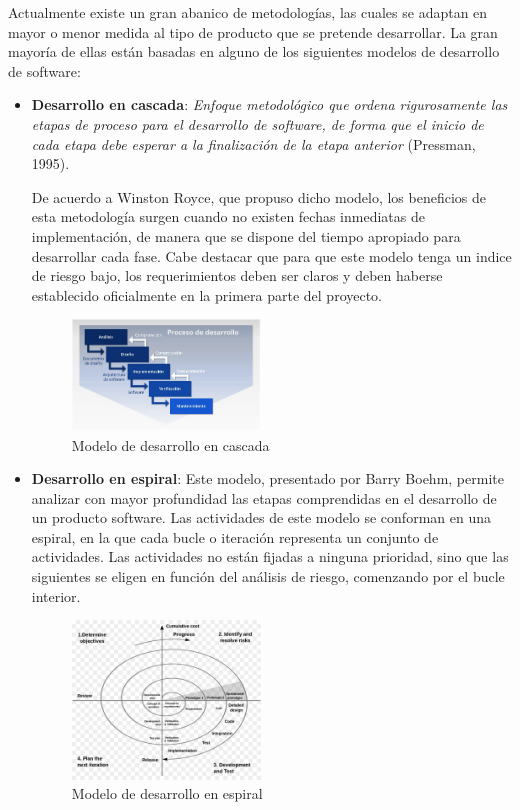 Actualmente existe un gran abanico de metodologías, las cuales se adaptan en mayor o menor medida al tipo de producto 
que se pretende desarrollar. La gran mayoría de ellas están basadas en alguno de los siguientes modelos de desarrollo 
de software:
\begin{itemize}
    \item \textbf{Desarrollo en cascada}: \textit{Enfoque metodológico que ordena rigurosamente las etapas de proceso para el 
    desarrollo de software, de forma que el inicio de cada etapa debe esperar a la finalización de la etapa 
    anterior} (Pressman, 1995). 

    De acuerdo a Winston Royce, que propuso dicho modelo, los beneficios de esta metodología surgen cuando no existen 
    fechas inmediatas de implementación, de manera que se dispone del tiempo apropiado para desarrollar cada fase.
    Cabe destacar que para que este modelo tenga un indice de riesgo bajo, los requerimientos deben ser claros y deben 
    haberse establecido oficialmente en la primera parte del proyecto.

    \begin{figure}[H]
        \centering
        \includegraphics[width=5cm]{Figures/modelo_cascada.jpg}
        \caption{Modelo de desarrollo en cascada}
    \end{figure}
    \newpage

    \item \textbf{Desarrollo en espiral}: Este modelo, presentado por Barry Boehm, permite analizar con mayor profundidad 
    las etapas comprendidas en el desarrollo de un producto software. Las actividades de este modelo se conforman en una espiral, 
    en la que cada bucle o iteración representa un conjunto de actividades. Las actividades no están fijadas a ninguna prioridad, 
    sino que las siguientes se eligen en función del análisis de riesgo, comenzando por el bucle interior.

    \begin{figure}[H]
        \centering
        \includegraphics[width=5cm]{Figures/modelo_espiral.jpg}
        \caption{Modelo de desarrollo en espiral}
    \end{figure}


\end{itemize}
